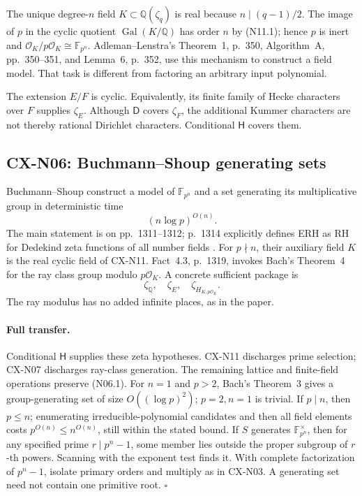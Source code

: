 \documentclass[11pt,a4paper]{article}
\begin{document}
The unique degree-\(n\) field \(K\subset\mathbb Q(\zeta_q)\) is real
because \(n\mid(q-1)/2\). The image of \(p\) in the cyclic quotient
\(\operatorname{Gal}(K/\mathbb Q)\) has order \(n\) by (N11.1);
hence \(p\) is inert and \(\mathcal O_K/p\mathcal O_K\cong\mathbb F_{p^n}\).
Adleman--Lenstra's Theorem~1, p.~350, Algorithm~A, pp.~350--351,
and Lemma~6, p.~352, use this mechanism to construct a field model.
That task is different from factoring an arbitrary input polynomial.

The extension \(E/F\) is cyclic. Equivalently, its finite family of
Hecke characters over \(F\) supplies \(\zeta_E\). Although \(\mathsf D\)
covers \(\zeta_F\), the additional Kummer characters are not thereby
rational Dirichlet characters. Conditional \(\mathsf H\) covers them.

\subsection{CX-N06: Buchmann--Shoup generating sets}
\label{cx-n06}

Buchmann--Shoup construct a model of \(\mathbb F_{p^n}\) and a set
generating its multiplicative group in deterministic time
\[
                              (n\log p)^{O(n)}.                \tag{N06.1}
\]
The main statement is on pp.~1311--1312; p.~1314 explicitly defines
ERH as RH for Dedekind zeta functions of all number fields
\cite{CXNBuchmannShoup96}.
For \(p\nmid n\), their auxiliary field \(K\) is the real cyclic field of
CX-N11. Fact~4.3, p.~1319, invokes Bach's Theorem~4 for the ray class
group modulo \(p\mathcal O_K\). A concrete sufficient package is
\[
                   \zeta_{\mathbb Q},\quad\zeta_E,\quad
                   \zeta_{H_{K,p\mathcal O_K}} .
\]
The ray modulus has no added infinite places, as in the paper.

\paragraph{Full transfer.}
Conditional \(\mathsf H\) supplies these zeta hypotheses. CX-N11
discharges prime selection; CX-N07 discharges ray-class generation.
The remaining lattice and finite-field operations preserve (N06.1).
For \(n=1\) and \(p>2\), Bach's Theorem~3 gives a group-generating set of size \(O((\log p)^2)\); \(p=2,n=1\) is trivial. If \(p\mid n\), then \(p\leq n\); enumerating irreducible-polynomial candidates and then all field elements costs \(p^{O(n)}\leq n^{O(n)}\), still within the stated bound. If \(S\) generates \(\mathbb F_{p^n}^\times\), then
for any specified prime \(r\mid p^n-1\), some member lies outside the
proper subgroup of \(r\)-th powers. Scanning with the exponent test
finds it. With complete factorization of \(p^n-1\), isolate primary
orders and multiply as in CX-N03. A generating set need not contain
one primitive root. \(\square\)
\end{document}
